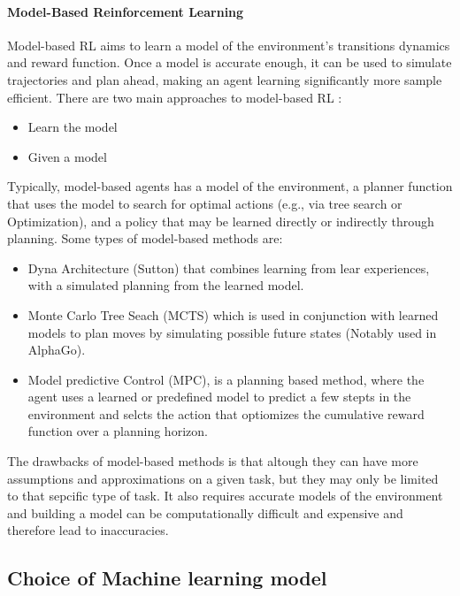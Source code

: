 \paragraph{Model-Based Reinforcement Learning}
Model-based RL aims to learn a model of the environment's transitions dynamics
and reward function. Once a model is accurate enough, it can be used to 
simulate trajectories and plan ahead, making an agent learning significantly more
sample efficient. There are two main approaches to model-based RL \cite{ReinforcementLearning}:
\begin{itemize}
      \item Learn the model 
      \item Given a model
\end{itemize}
Typically, model-based agents has a model of the environment, a planner function that uses
the model to search for optimal actions (e.g., via tree search or Optimization), and a policy
that may be learned directly or indirectly through planning.
Some types of model-based methods are:
\begin{itemize}
      \item Dyna Architecture (Sutton) that combines learning from lear experiences, 
      with a simulated planning from the learned model.
      \item Monte Carlo Tree Seach (MCTS) which is used in conjunction with learned models
      to plan moves by simulating possible future states (Notably used in AlphaGo). \cite{ReinforcementLearning}
      \item Model predictive Control (MPC), is a planning based method, where the agent
      uses a learned or predefined model to predict a few stepts in the environment and 
      selcts the action that optiomizes the cumulative reward function over a planning horizon. \cite{Types-of-Reinforcement-Learning} 
\end{itemize}
The drawbacks of model-based methods is that altough they can have more assumptions
and approximations on a given task, but they may only be limited to that sepcific 
type of task. It also requires accurate models of the environment and building a model
can be computationally difficult and expensive and therefore lead to inaccuracies. \cite{Types-of-Reinforcement-Learning}

\subsection{Choice of Machine learning model}

